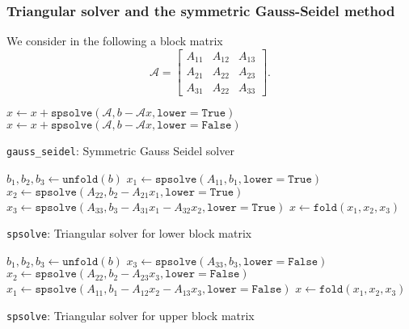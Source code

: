 \subsubsection{Triangular solver and the symmetric Gauss-Seidel method}
We consider in the following a block matrix 
%
\begin{equation} %
\mathcal{A} =\begin{bmatrix}
 A_{11} & A_{12} & A_{13}  \\
 A_{21} & A_{22} & A_{23}  \\
 A_{31} & A_{22} & A_{33}  
\end{bmatrix}.
\end{equation}
%

\begin{algorithm}[H]
\DontPrintSemicolon
\SetAlgoLined
{}
\BlankLine

   {
    $x \gets x + \texttt{spsolve}(\mathcal{A}, b - \mathcal{A} x, \texttt{lower}=\texttt{True})$ \; 
  }
   {
    $x \gets x + \texttt{spsolve}(\mathcal{A}, b - \mathcal{A} x, \texttt{lower}=\texttt{False})$ \; 
  }

\caption{\texttt{gauss\_seidel}: Symmetric Gauss Seidel solver}
\end{algorithm} 

\begin{algorithm}[H]
\DontPrintSemicolon
\SetAlgoLined
{}
\BlankLine

  $b_1, b_2, b_3 \gets \texttt{unfold}(b)$ \; 
  $x_1 \gets \texttt{spsolve}(A_{11}, b_1, \texttt{lower}=\texttt{True})$                                    
  $x_2 \gets \texttt{spsolve}(A_{22}, b_2 - A_{21} x_1, \texttt{lower}=\texttt{True})$                       
  $x_3 \gets \texttt{spsolve}(A_{33}, b_3 - A_{31} x_1 - A_{32} x_2, \texttt{lower}=\texttt{True})$          
  $x \gets \texttt{fold}(x_1, x_2, x_3)$ \; 

\caption{\texttt{spsolve}: Triangular solver for lower block matrix}
\end{algorithm} 

\begin{algorithm}[H]
\DontPrintSemicolon
\SetAlgoLined
{}
\BlankLine

  $b_1, b_2, b_3 \gets \texttt{unfold}(b)$ \; 
  $x_3 \gets \texttt{spsolve}(A_{33}, b_3, \texttt{lower}=\texttt{False})$                                    
  $x_2 \gets \texttt{spsolve}(A_{22}, b_2 - A_{23} x_3, \texttt{lower}=\texttt{False})$                       
  $x_1 \gets \texttt{spsolve}(A_{11}, b_1 - A_{12} x_2 - A_{13} x_3, \texttt{lower}=\texttt{False})$          
  $x \gets \texttt{fold}(x_1, x_2, x_3)$ \; 

\caption{\texttt{spsolve}: Triangular solver for upper block matrix}
\end{algorithm} 

